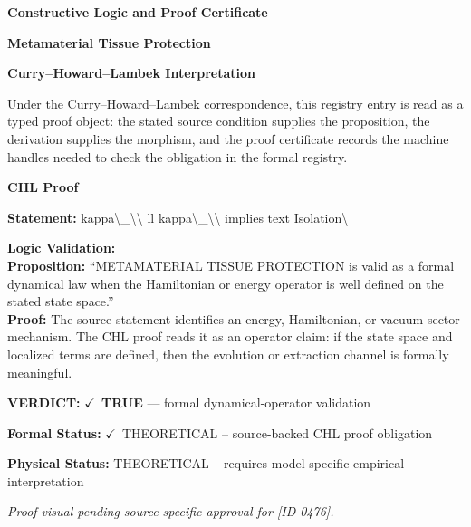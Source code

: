 \clearpage
\begingroup\tzpsupportsetup
\noindent\textbf{\fontsize{10.8pt}{12.8pt}\selectfont [ID 0476] Constructive Logic and Proof Certificate}\par
\noindent\textbf{\fontsize{10pt}{12pt}\selectfont Metamaterial Tissue Protection}\par
\vspace{0.45em}
\begingroup
\footnotesize
\setlength{\parskip}{0.22em}
\setlength{\parindent}{0pt}
\noindent\textbf{Curry--Howard--Lambek Interpretation}\par
Under the Curry--Howard--Lambek correspondence, this registry entry is read as a typed proof
object: the stated source condition supplies the proposition, the derivation supplies the
morphism, and the proof certificate records the machine handles needed to check the obligation
in the formal registry.

\vspace{0.45em}
\noindent\textbf{CHL Proof}\par
\textbf{Statement:} kappa\textbackslash{}\_\textbackslash{}\textbackslash{} ll kappa\textbackslash{}\_\textbackslash{}\textbackslash{} implies text Isolation\textbackslash{}

\textbf{Logic Validation:}\\
\textbf{Proposition:} ``METAMATERIAL TISSUE PROTECTION is valid as a formal dynamical law when the Hamiltonian
or energy operator is well defined on the stated state space.''\\
\textbf{Proof:} The source statement identifies an energy, Hamiltonian, or vacuum-sector mechanism. The
CHL proof reads it as an operator claim: if the state space and localized terms are
defined, then the evolution or extraction channel is formally meaningful.

\textbf{VERDICT:} \ensuremath{\checkmark}\ \textbf{TRUE} --- formal dynamical-operator validation

\textbf{Formal Status:} \ensuremath{\checkmark}\ THEORETICAL -- source-backed CHL proof obligation

\textbf{Physical Status:} THEORETICAL -- requires model-specific empirical interpretation
\par\vspace{0.45em}
\par
\vfill
\begingroup\footnotesize\itshape
Proof visual pending source-specific approval for [ID 0476].
\par\endgroup
\vfill
\endgroup
\endgroup

